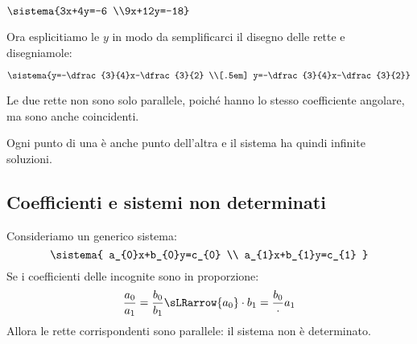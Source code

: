  \begin{esempio}
\(\sistema{3x+4y=-6 \\9x+12y=-18}\)
\vspace{1em}

Ora esplicitiamo le \(y\) in modo da semplificarci il disegno delle rette e 
disegniamole:

\begin{minipage}{.48\textwidth}
\[\sistema{y=-\dfrac{3}{4}x-\dfrac{3}{2} \\[.5em] 
           y=-\dfrac{3}{4}x-\dfrac{3}{2}}\]

Le due rette non sono solo parallele, poiché hanno lo stesso coefficiente 
angolare, ma sono anche coincidenti. 

Ogni punto di una è anche punto dell'altra e il sistema ha quindi infinite 
soluzioni.
\end{minipage}
\hfill
\begin{minipage}{.48\textwidth}
\begin{center}
\end{center}
\end{minipage}

\end{esempio}

\subsection{Coefficienti e sistemi non determinati}

Consideriamo un generico sistema:
\[\sistema{
 a_{0}x+b_{0}y=c_{0} \\
 a_{1}x+b_{1}y=c_{1} 
}\]
Se i coefficienti delle incognite sono in proporzione:
\[\frac{a_{0}}{a_{1}} = \frac{b_{0}}{b_{1}} \sLRarrow
{a_{0}} \cdot {b_{1}} = \frac{b_{0}} \cdot {a_{1}}\]
Allora le rette corrispondenti sono parallele: il sistema non è determinato.

